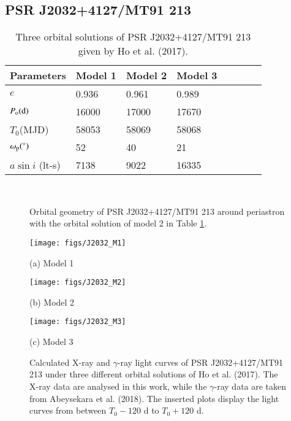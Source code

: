 \documentclass{aa}
\def\PSRJ2032{PSR J2032+4127/MT91 213}
\begin{document}
\subsection{\PSRJ2032}
\begin{table}
\caption{Three orbital solutions of \PSRJ2032 given by Ho et al. (2017). \label{tab:J2032}}
\begin{tabular}{l l l l l l l l}
\hline
Parameters&Model 1 &Model 2 &Model 3\\
\hline
$e$ & 0.936  &0.961 &0.989  \\
$P_{\rm o}(\rm{d})$ &16000 &17000 &17670  \\
$T_0$(MJD) & 58053& 58069& 58068\\
$\omega_{\rm p}(^{\circ})$ & 52& 40 &21 \\
$a\sin{i}$ (lt-s) & 7138 & 9022&16335\\
\hline
\end{tabular}
\\
{{
\footnotesize
}}
\end{table}

\begin{figure}
\caption{
Orbital geometry of \PSRJ2032 around periastron with the orbital solution of model 2 in Table  \ref{tab:J2032}.
}
\label{fig:J2032_O}
\end{figure}

\begin{figure}
\begin{minipage}{\linewidth}
  \centerline{\texttt{[image: figs/J2032\_M1]}}
  \centerline{(a) Model 1}
\end{minipage}
\vfill
\begin{minipage}{\linewidth}
  \centerline{\texttt{[image: figs/J2032\_M2]}}
  \centerline{(b) Model 2}
\end{minipage}
\vfill
\begin{minipage}{\linewidth}
  \centerline{\texttt{[image: figs/J2032\_M3]}}
  \centerline{(c) Model 3}
\end{minipage}
\caption{Calculated X-ray and $\gamma$-ray light curves of \PSRJ2032 under three different orbital solutions of Ho et al. (2017). The X-ray data are analysed in this work, while the $\gamma$-ray data are taken from Abeysekara et al. (2018). The inserted plots display the light curves from between $T_0-120$ d to $T_0+120$ d.}
\label{fig:J2032}
\end{figure}
\end{document}

